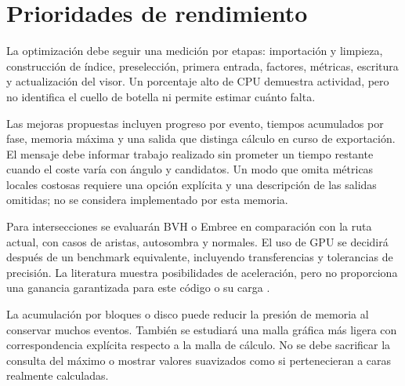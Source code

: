 \section{Prioridades de rendimiento}
La optimización debe seguir una medición por etapas: importación y limpieza, construcción de índice, preselección, primera entrada, factores, métricas, escritura y actualización del visor. Un porcentaje alto de CPU demuestra actividad, pero no identifica el cuello de botella ni permite estimar cuánto falta.

Las mejoras propuestas incluyen progreso por evento, tiempos acumulados por fase, memoria máxima y una salida que distinga cálculo en curso de exportación. El mensaje debe informar trabajo realizado sin prometer un tiempo restante cuando el coste varía con ángulo y candidatos. Un modo que omita métricas locales costosas requiere una opción explícita y una descripción de las salidas omitidas; no se considera implementado por esta memoria.

Para intersecciones se evaluarán BVH o Embree en comparación con la ruta actual, con casos de aristas, autosombra y normales. El uso de GPU se decidirá después de un benchmark equivalente, incluyendo transferencias y tolerancias de precisión. La literatura muestra posibilidades de aceleración, pero no proporciona una ganancia garantizada para este código o su carga \citep{rana2012,takata2018}.

La acumulación por bloques o disco puede reducir la presión de memoria al conservar muchos eventos. También se estudiará una malla gráfica más ligera con correspondencia explícita respecto a la malla de cálculo. No se debe sacrificar la consulta del máximo o mostrar valores suavizados como si pertenecieran a caras realmente calculadas.

